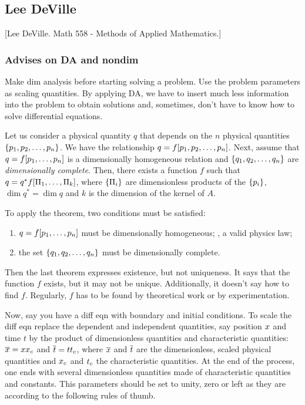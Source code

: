 \subsection{Lee DeVille}
[Lee DeVille. Math 558 - Methods of Applied Mathematics.]


\subsubsection{Advises on DA and nondim}

Make dim analysis before starting solving a problem. Use the problem parameters as scaling quantities. By applying DA, we have to insert much less information into the problem to obtain solutions and, sometimes, don't have to know how to solve differential equations.

\begin{theorem}
Let us consider a physical quantity $q$ that depends on the $n$ physical quantities $\left\lbrace{p_1, p_2, \dotsc, p_n}\right\rbrace$. We have the relationship $q = f\!\left[{p_1, p_2, \dotsc, p_n}\right]$. Next, assume that $q = f\!\left[{p_1, \dotsc, p_n}\right]$ is a dimensionally homogeneous relation and $\left\lbrace{q_1, q_2, \dotsc, q_n}\right\rbrace$ are \emph{dimensionally complete}. Then, there exists a function $f$ such that $q = q^* f\!\left[{\Pi_1, \dotsc, \Pi_k}\right]$, where $\left\lbrace{\Pi_i}\right\rbrace$ are dimensionless products of the $\left\lbrace{p_i}\right\rbrace$, $\dim q^* = \dim q$ and $k$ is the dimension of the kernel of $A$.
\end{theorem}

To apply the theorem, two conditions must be satisfied:
\begin{enumerate}
\item $q = f\!\left[{p_1, \dotsc, p_n}\right]$ must be dimensionally homogeneous; \ie, a valid physics law;
\item the set $\left\lbrace{q_1, q_2, \dotsc, q_n}\right\rbrace$ must be dimensionally complete.
\end{enumerate}
Then the last theorem expresses existence, but not uniqueness. It says that the function $f$ exists, but it may not be unique. Additionally, it doesn't say how to find $f$. Regularly, $f$ has to be found by theoretical work or by experimentation.

Now, say you have a diff eqn with boundary and initial conditions. To scale the diff eqn replace the dependent and independent quantities, say position $x$ and time $t$ by the product of dimensionless quantities and characteristic quantities: $\overline{x} = x{x}_{c}$ and $\overline{t} = t{t}_{c}$, where $\overline{x}$ and $\overline{t}$ are the dimensionless, scaled physical quantities and ${x}_{c}$ and ${t}_{c}$ the characteristic quantities. At the end of the process, one ends with several dimensionless quantities made of characteristic quantities and constants. This parameters should be set to unity, zero or left as they are according to the following rules of thumb.


